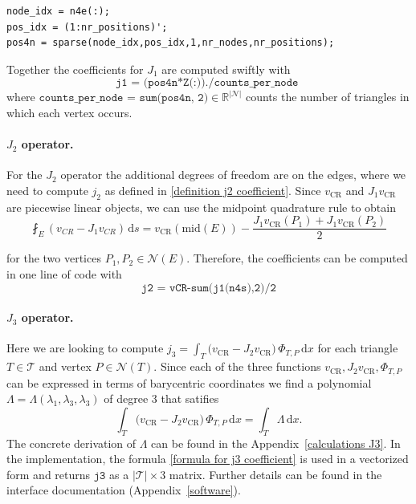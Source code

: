 \documentclass[11pt,a4paper]{article}
\newcommand{\vCR}{v_{\mathrm{CR}}}
\newcommand{\dx}{\,\mathrm{d}x}
\newcommand{\ds}{\,\mathrm{d}s}
\begin{document}
\begin{lstlisting}
node_idx = n4e(:);
pos_idx = (1:nr_positions)';
pos4n = sparse(node_idx,pos_idx,1,nr_nodes,nr_positions);
\end{lstlisting}

Together the coefficients for \(J_1\) are computed swiftly with
\[
\texttt{
j1 = (pos4n*Z(:))./counts\_per\_node 
}
\]
where \(\texttt{counts\_per\_node = sum(pos4n, 2)} \in \mathbb{R}^{|\mathcal{N}|}\) counts the number of triangles in which each vertex occurs. 

\paragraph{\(J_2\) operator.}
For the \(J_2\) operator the additional degrees of freedom are on the edges, where we need to compute \(j_2\) as defined in \eqref{definition j2 coefficient}. Since \(\vCR\) and \(J_1\vCR\) are piecewise linear objects, we can use the midpoint quadrature rule to obtain
\begin{equation} \label{j2 coefficients}
\fint_{E} \left( v_{CR} - J_{1} v_{CR} \right) \ds = \vCR(\text{mid}(E)) - \frac{J_1 \vCR(P_1) + J_1 \vCR(P_2)}{2}
\end{equation}

for the two vertices \(P_1, P_2 \in \mathcal{N}(E)\). Therefore, the coefficients can be computed in one line of code with 
\[
\texttt{j2 = vCR-sum(j1(n4s),2)/2}
\]

\paragraph{\(J_3\) operator.}
Here we are looking to compute \(j_3 = \int_T \bigl( \vCR - J_2 \vCR \bigr)\, \Phi_{T,P} \dx\) for each triangle \(T \in \mathcal{T}\) and vertex \(P \in \mathcal{N}(T)\). Since each of the three functions \(\vCR, J_2 \vCR, \Phi_{T,P}\) can be expressed in terms of barycentric coordinates we find a polynomial \(\Lambda =\Lambda(\lambda_1, \lambda_3, \lambda_3)\) of degree 3 that satifies
\begin{equation}
\label{equation j3 operator}
\int_T \bigl( \vCR - J_2 \vCR \bigr)\, \Phi_{T,P} \dx = \int_T \Lambda \dx.
\end{equation}
The concrete derivation of \(\Lambda\) can be found in the Appendix~\ref{calculations J3}. In the implementation, the formula \eqref{formula for j3 coefficient} is used in a vectorized form and returns \(\texttt{j3}\) as a \(|\mathcal{T}| \times 3\) matrix. Further details can be found in the interface documentation (Appendix~\ref{software}).
\end{document}
